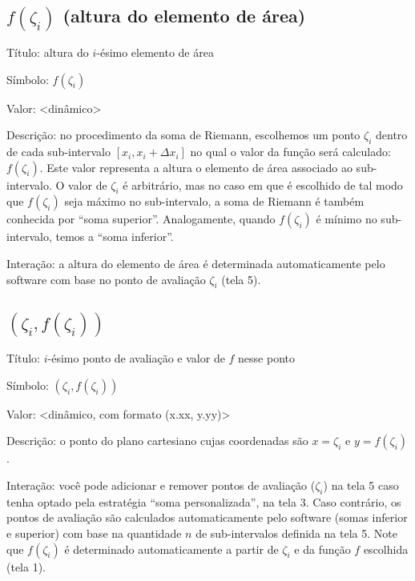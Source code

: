 \documentclass[a4paper,10pt]{scrartcl}
\begin{document}
  \subsection*{$f(\zeta_i)$ (altura do elemento de área)}
    \begin{compactdesc}
      \item{Título:} altura do $i$-ésimo elemento de área
      \item{Símbolo:} $f(\zeta_i)$
      \item{Valor:} <dinâmico>
      \item{Descrição:} no procedimento da soma de Riemann, escolhemos um ponto $\zeta_i$ dentro de cada sub-intervalo $[x_i,x_i + \Delta x_i]$ no qual o valor da função será calculado: $f(\zeta_i)$. Este valor representa a altura o elemento de área associado ao sub-intervalo. O valor de $\zeta_i$ é arbitrário, mas no caso em que é escolhido de tal modo que $f(\zeta_i)$ seja máximo no sub-intervalo, a soma de Riemann é também conhecida por ``soma superior''. Analogamente, quando $f(\zeta_i)$ é mínimo no sub-intervalo, temos a ``soma inferior''.
      \item{Interação:} a altura do elemento de área é determinada automaticamente pelo software com base no ponto de avaliação $\zeta_i$ (tela 5).
    \end{compactdesc}

    \newpage
    
  \subsection*{$(\zeta_i,f(\zeta_i))$}
    \begin{compactdesc}
      \item{Título:} $i$-ésimo ponto de avaliação e valor de $f$ nesse ponto
      \item{Símbolo:} $(\zeta_i,f(\zeta_i))$
      \item{Valor:} <dinâmico, com formato (x.xx, y.yy)>
      \item{Descrição:} o ponto do plano cartesiano cujas coordenadas são $x = \zeta_i$ e $y = f(\zeta_i)$.
      \item{Interação:} você pode adicionar e remover pontos de avaliação ($\zeta_i$) na tela 5 caso tenha optado pela estratégia ``soma personalizada'', na tela 3. Caso contrário, os pontos de avaliação são calculados automaticamente pelo software (somas inferior e superior) com base na quantidade $n$ de sub-intervalos definida na tela 5. Note que $f(\zeta_i)$ é determinado automaticamente a partir de $\zeta_i$ e da função $f$ escolhida (tela 1).
    \end{compactdesc}
\end{document}
